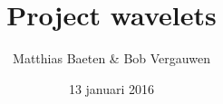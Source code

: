 

\title{Project wavelets}
\author{Matthias Baeten \& Bob Vergauwen}
\date{ 13 januari 2016}



	\maketitle
	
	
	

